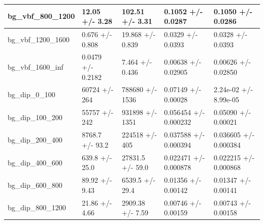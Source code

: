 \documentclass[a4paper, 10pt]{article}
\begin{document}
\begin{table}[H]
\begin{center}
\begin{tabular}{|m{20.0mm}|m{27.0mm}|m{27.0mm}|m{33.0mm}|m{32.0mm}|}
      \hline
      {\cellcolor{white}         bg\_vbf\_800\_1200}& {\cellcolor{white}         12.05 +/\-- 3.28}& {\cellcolor{white}         102.51 +/\-- 3.31}& {\cellcolor{white}         0.1052 +/\-- 0.0287}& {\cellcolor{white}         0.1050 +/\-- 0.0286}\\
      \hline
      {\cellcolor{white}         bg\_vbf\_1200\_1600}& {\cellcolor{white}         0.676 +/\-- 0.808}& {\cellcolor{white}         19.868 +/\-- 0.839}& {\cellcolor{white}         0.0329 +/\-- 0.0393}& {\cellcolor{white}         0.0328 +/\-- 0.0393}\\
      \hline
      {\cellcolor{white}         bg\_vbf\_1600\_inf}& {\cellcolor{white}         0.0479 +/\-- 0.2182}& {\cellcolor{white}         7.464 +/\-- 0.436}& {\cellcolor{white}         0.00638 +/\-- 0.02905}& {\cellcolor{white}         0.00626 +/\-- 0.02850}\\
      \hline
      {\cellcolor{white}         bg\_dip\_0\_100}& {\cellcolor{white}         60724 +/\-- 264}& {\cellcolor{white}         788680 +/\-- 1536}& {\cellcolor{white}         0.07149 +/\-- 0.00028}& {\cellcolor{white}         2.24e-02 +/\-- 8.99e-05}\\
      \hline
      {\cellcolor{white}         bg\_dip\_100\_200}& {\cellcolor{white}         55757 +/\-- 242}& {\cellcolor{white}         931898 +/\-- 1351}& {\cellcolor{white}         0.056454 +/\-- 0.000232}& {\cellcolor{white}         0.05090 +/\-- 0.00021}\\
      \hline
      {\cellcolor{white}         bg\_dip\_200\_400}& {\cellcolor{white}         8768.7 +/\-- 93.2}& {\cellcolor{white}         224518 +/\-- 405}& {\cellcolor{white}         0.037588 +/\-- 0.000394}& {\cellcolor{white}         0.036605 +/\-- 0.000384}\\
      \hline
      {\cellcolor{white}         bg\_dip\_400\_600}& {\cellcolor{white}         639.8 +/\-- 25.0}& {\cellcolor{white}         27831.5 +/\-- 59.0}& {\cellcolor{white}         0.022471 +/\-- 0.000878}& {\cellcolor{white}         0.022215 +/\-- 0.000868}\\
      \hline
      {\cellcolor{white}         bg\_dip\_600\_800}& {\cellcolor{white}         89.92 +/\-- 9.43}& {\cellcolor{white}         6539.5 +/\-- 29.4}& {\cellcolor{white}         0.01356 +/\-- 0.00142}& {\cellcolor{white}         0.01347 +/\-- 0.00141}\\
      \hline
      {\cellcolor{white}         bg\_dip\_800\_1200}& {\cellcolor{white}         21.86 +/\-- 4.66}& {\cellcolor{white}         2909.38 +/\-- 7.59}& {\cellcolor{white}         0.00746 +/\-- 0.00159}& {\cellcolor{white}         0.00743 +/\-- 0.00158}\\

\end{tabular}
\end{center}
\end{table}
\end{document}
